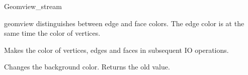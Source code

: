 \begin{ccClass}{Geomview_stream}


geomview distinguishes between edge and face colors. The edge color
is at the same time the color of vertices. 

{Makes  the color of vertices, edges and faces in subsequent IO 
 operations.}

{Changes the background color. Returns the old value.}


\end{ccClass}
